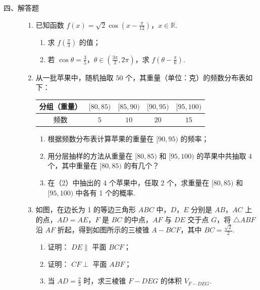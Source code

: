 \begin{description}

    \item[四、解答题]

    \begin{enumerate}[leftmargin=5pt]

      \addtocounter{enumi}{+15}

        \item 已知函数 \(f(x) = \sqrt{2}\cos \left(x - \frac{\pi}{12}\right)\)，\(x \in \mathbb{R}\).
\begin{enumerate}
\item 求 \( f\left(\frac{\pi}{3}\right) \) 的值；
\item 若 \(\cos\theta=\frac{3}{5}\)，\(\theta\in\left(\frac{3\pi}{2},2\pi\right)\)，求 \( f\left(\theta-\frac{\pi}{6}\right) \).
\end{enumerate}

        \item 从一批苹果中，随机抽取 \(50\) 个，其重量（单位：克）的频数分布表如下：

\begin{center}
\begin{tabular}{c|cccc}
分组（重量） & \( [80,85) \) & \( [85,90) \) & \( [90,95) \) & \( [95,100) \) \\
\hline
频数 & \(5\) & \(10\) & \(20\) & \(15\)
\end{tabular}
\end{center}

\begin{enumerate}
\item 根据频数分布表计算苹果的重量在 \([90,95)\) 的频率；
\item 用分层抽样的方法从重量在 \([80,85)\) 和 \([95,100)\) 的苹果中共抽取 4 个，其中重量在 \([80,85)\) 的有几个？
\item 在（2）中抽出的 4 个苹果中，任取 2 个，求重量在 \([80,85)\) 和 \([95,100)\) 中各有 1 个的概率.
\end{enumerate}

        \item 如图，在边长为 1 的等边三角形 \(ABC\) 中，\(D\)，\(E\) 分别是 \(AB\)，\(AC\) 上的点，\(AD = AE\)，\(F\) 是 \(BC\) 的中点，\(AF\) 与 \(DE\) 交于点 \(G\)，将 \(\triangle ABF\) 沿 \(AF\) 折起，得到如图所示的三棱锥 \(A - BCF\)，其中 \(BC = \frac{\sqrt{2}}{2}\).
\begin{enumerate}
\item 证明： \(DE \parallel\) 平面 \(BCF\)；
\item 证明： \(CF \perp\) 平面 \(ABF\)；
\item 当 \(AD = \frac{2}{3}\) 时，求三棱锥 \(F - DEG\) 的体积 \(V_{F - DEG}\).
\end{enumerate}


\end{enumerate}
\end{description}
